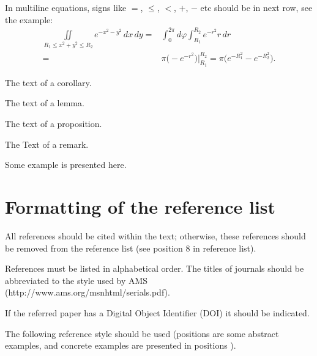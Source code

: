 \documentclass[12pt,twoside,draft]{cmpart}
\begin{document}
In multiline equations, signs like 
$=$, $\le$, $<$, $+$, $-$ etc should be in next row, see the example:
\[
\begin{split}
\iint\limits_{R_1\le x^2+y^2\le R_2} e^{-x^2-y^2}\,dx\,dy
=&\int_0^{2\pi} d\varphi\int_{R_1}^{R_2} e^{-r^2} r\,dr\\
=&\pi\big(-e^{-r^2}\big)\big\vert_{R_1}^{R_2}=\pi\big(e^{-R_1^2}-e^{-R_2^2}\big).
\end{split}
\]

\begin{corollary}
The text of a corollary.
\end{corollary}

\begin{lemma}
The text of a lemma.
\end{lemma}

\begin{proposition}
The text of a proposition.
\end{proposition}

\begin{remark}
The Text of a remark.
\end{remark}

\begin{example}
Some example is presented here.
\end{example}

\section{Formatting of the reference list}

All references should be cited within the text; 
otherwise, these references should be removed from the reference list
(see position 8 in reference list).

References must be listed in alphabetical order. 
The titles of journals should be abbreviated to the style used by AMS 
(http://www.ams.org/msnhtml/serials.pdf).

If the referred paper has a Digital Object Identifier (DOI)
it should be indicated.

The following reference style should be used
(positions \cite{k1,k2,k3,k4,k5,k6,k7} are some abstract examples,
and concrete examples are presented in positions \cite{ke1,ke2,ke3,ke4,ke5,ke6,ke7}).
\end{document}
